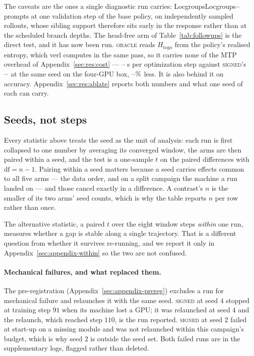 \documentclass[11pt]{article}
\newcommand{\Htogo}{H_{\mathrm{togo}}}
\providecommand{\PENDING}{\textcolor{red}{\textbf{--}}}
\newcommand{\num}[1]{\ifcsname #1\endcsname\csname #1\endcsname\else\PENDING\fi}
\begin{document}
The caveats are the ones a single diagnostic run carries: \num{Locgroups}
prompts at one validation step of the base policy, on independently sampled
rollouts, whose sibling support therefore sits early in the response rather
than at the scheduled branch depths. The head-free arm of
Table~\ref{tab:followups} is the direct test, and it has now been run.
\textsc{oracle} reads $\Htogo$ from the policy's realised entropy, which verl
\citep{sheng2025hybridflow} computes in the same pass, so it carries none of the MTP overhead of
Appendix~\ref{sec:res:cost} --- $\num{Roraclecost}$\,s per optimization step
against \textsc{signed}'s $\num{Fsignedoracleref}$ at the same seed on the four-GPU box,
$\num{Fsignedoraclesaving}\%$ less. It is also
behind it on accuracy. Appendix~\ref{sec:res:ablate} reports both numbers and what
one seed of each can carry.

\subsection{Seeds, not steps}
\label{sec:res:seeds}

Every statistic above treats the seed as the unit of analysis: each run is first
collapsed to one number by averaging its converged window, the arms are then paired
within a seed, and the test is a one-sample $t$ on the paired differences with
$\mathrm{df} = n - 1$. Pairing within a seed matters because a seed carries effects
common to all five arms --- the data order, and on a split campaign the machine a run
landed on --- and those cancel exactly in a difference. A contrast's $n$ is the
smaller of its two arms' seed counts, which is why the table reports $n$ per row
rather than once.

The alternative statistic, a paired $t$ over the eight window steps \emph{within} one
run, measures whether a gap is stable along a single trajectory. That is a different
question from whether it survives re-running, and we report it only in
Appendix~\ref{sec:appendix-within} so the two are not confused.

\paragraph{Mechanical failures, and what replaced them.} The pre-registration
(Appendix~\ref{sec:appendix-prereg}) excludes a run for mechanical failure and
relaunches it with the same seed. \textsc{signed} at seed $4$ stopped at training step $91$
when its machine lost a GPU; it was relaunched at seed $4$ and the relaunch, which
reached step $110$, is the run reported. \textsc{signed} at seed $2$ failed at start-up on a
missing module and was not relaunched within this campaign's budget, which is why
seed $2$ is outside the seed set. Both failed runs are in the supplementary logs,
flagged rather than deleted.
\end{document}
